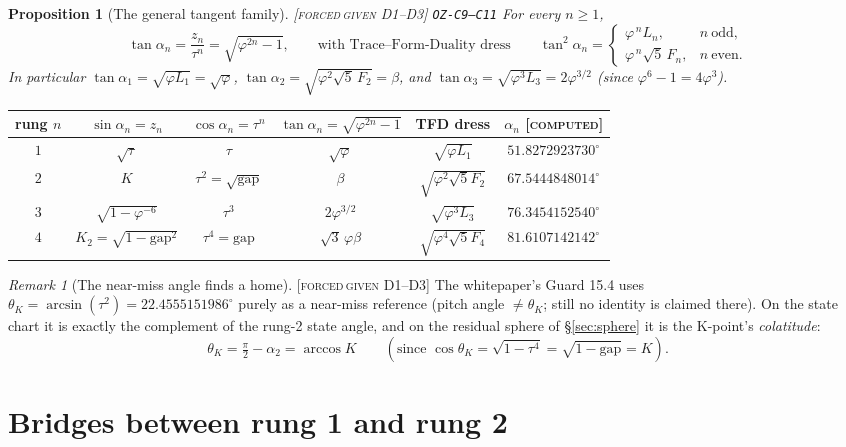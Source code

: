 \documentclass[11pt]{article}
\newcommand{\tagFD}{\textcolor{cF}{\textsc{[forced}}\,\textcolor{cD}{\textsc{given D1--D3]}}}
\newcommand{\tagC}{\textcolor{cC}{\textsc{[computed]}}}
\newcommand{\hx}[1]{\textcolor{cC}{\footnotesize\texttt{#1}}}
\newcommand{\gp}{\varphi}
\newcommand{\gapc}{\mathrm{gap}}
\theoremstyle{plain}
\newtheorem{proposition}[theorem]{Proposition}
\theoremstyle{definition}
\theoremstyle{remark}
\newtheorem{remark}[theorem]{Remark}
\begin{document}
\begin{proposition}[The general tangent family]\label{prop:tangents}\tagFD{} \hx{OZ-C9--C11}
For every $n\ge1$,
\[
\tan\alpha_n=\frac{z_n}{\tau^n}=\sqrt{\gp^{2n}-1},
\qquad\text{with Trace--Form-Duality dress}\qquad
\tan^2\alpha_n=\begin{cases}\gp^{\,n}L_n,& n\ \text{odd},\\[2pt]
\gp^{\,n}\sqrt5\,F_n,& n\ \text{even}.\end{cases}
\]
In particular $\tan\alpha_1=\sqrt{\gp L_1}=\sqrt\gp$,
$\tan\alpha_2=\sqrt{\gp^2\sqrt5\,F_2}=\beta$, and
$\tan\alpha_3=\sqrt{\gp^3L_3}=2\gp^{3/2}$ (since $\gp^6-1=4\gp^3$).
\end{proposition}

\begin{center}\small
\begin{tabular}{@{}cccccc@{}}
\toprule
rung $n$ & $\sin\alpha_n=z_n$ & $\cos\alpha_n=\tau^n$ & $\tan\alpha_n=\sqrt{\gp^{2n}-1}$ & TFD dress & $\alpha_n$ \tagC{}\\
\midrule
$1$ & $\sqrt\tau$ & $\tau$ & $\sqrt\gp$ & $\sqrt{\gp L_1}$ & $51.8272923730^\circ$\\
$2$ & $K$ & $\tau^2=\sqrt{\gapc}$ & $\beta$ & $\sqrt{\gp^2\sqrt5F_2}$ & $67.5444848014^\circ$\\
$3$ & $\sqrt{1-\gp^{-6}}$ & $\tau^3$ & $2\gp^{3/2}$ & $\sqrt{\gp^3L_3}$ & $76.3454152540^\circ$\\
$4$ & $K_2=\sqrt{1-\gapc^2}$ & $\tau^4=\gapc$ & $\sqrt3\,\gp\beta$ & $\sqrt{\gp^4\sqrt5F_4}$ & $81.6107142142^\circ$\\
\bottomrule
\end{tabular}
\end{center}

\begin{remark}[The near-miss angle finds a home]\label{rem:thetaK}\tagFD{}
The whitepaper's Guard 15.4 uses $\theta_K=\arcsin(\tau^2)=22.4555151986^\circ$
purely as a near-miss reference (pitch angle $\neq\theta_K$; still no identity is
claimed there). On the state chart it is exactly the complement of the rung-2
state angle, and on the residual sphere of \S\ref{sec:sphere} it is the K-point's
\emph{colatitude}:
\[
\theta_K=\tfrac\pi2-\alpha_2=\arccos K
\qquad(\text{since }\cos\theta_K=\sqrt{1-\tau^4}=\sqrt{1-\gapc}=K).
\]
\end{remark}

\section{Bridges between rung 1 and rung 2}\label{sec:bridges}
\end{document}
